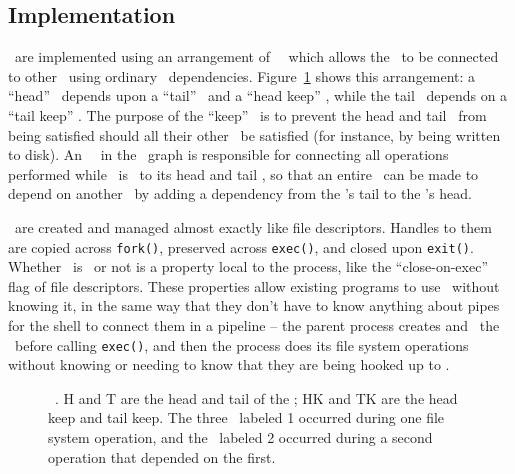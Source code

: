 
\subsection{Implementation}
\label{sec:opgroup:implementation}


\Opgroups\ are implemented using an arrangement of \noop\ \chdescs\ which allows
the \opgroup\ to be connected to other \opgroups\ using ordinary \chdesc\
dependencies.  Figure~\ref{fig:opgroup-chdescs} shows this arrangement: a
``head'' \chdesc\ depends upon a ``tail'' \chdesc\ and a ``head keep'' \chdesc,
while the tail \chdesc\ depends on a ``tail keep'' \chdesc. The purpose of the
``keep'' \chdescs\ is to prevent the head and tail \chdescs\ from being
satisfied should all their other \befores\ be satisfied (for instance, by
being written to disk). An \LFS\ \module\ in the \module\ graph is responsible for
connecting all operations performed while \anopgroup\ is \engaged\ to its head
and tail \chdescs, so that an entire \opgroup\ can be made to depend on another
\opgroup\ by adding a dependency from the \after's tail to the \before's
head.

\Opgroups\ are created and managed almost exactly like file descriptors. Handles
to them are copied across \texttt{fork()}, preserved across \texttt{exec()}, and
closed upon \texttt{exit()}. Whether \anopgroup\ is \engaged\ or not is a
property local to the process, like the ``close-on-exec'' flag of file
descriptors. These properties allow existing programs to use \opgroups\ without
knowing it, in the same way that they don't have to know anything about pipes
for the shell to connect them in a pipeline -- the parent process creates and
\engages\ the \opgroups\ before calling \texttt{exec()}, and then the process
does its file system operations without knowing or needing to know that they are
being hooked up to \anopgroup.

\begin{figure}[htb]
\caption{\label{fig:opgroup-chdescs} \Opgroup\ \chdescs. H and T are the head
and tail of the \opgroup; HK and TK are the head keep and tail keep. The three
\chdescs\ labeled 1 occurred during one file system operation, and the \chdesc\
labeled 2 occurred during a second operation that depended on the first.}
\end{figure}

